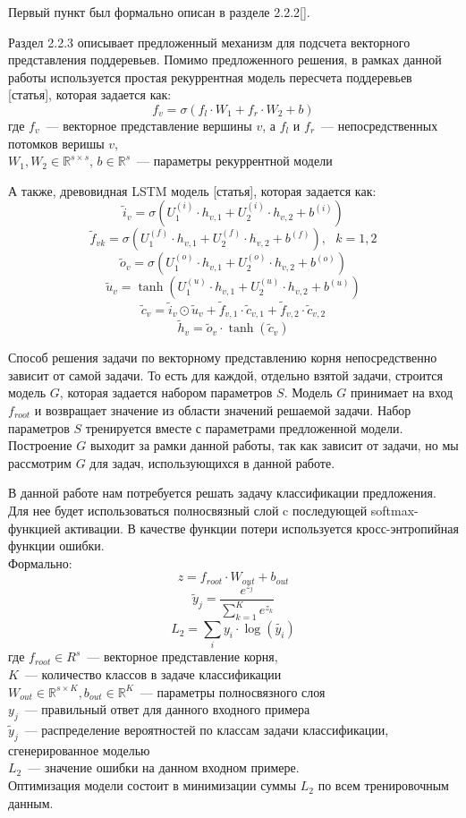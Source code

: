 Первый пункт был формально описан в разделе 2.2.2[].

Раздел 2.2.3 описывает предложенный механизм для подсчета векторного представления поддеревьев.
Помимо предложенного решения, в рамках данной работы используется простая рекуррентная модель пересчета поддеревьев [статья], которая задается как:
$$f_v = \sigma(f_l \cdot W_1 + f_r \cdot W_2 + b)$$
где $f_v$~--- векторное представление вершины $v$, а $f_l$ и $f_r$~--- непосредственных
потомков веришы $v$,\\
$W_1, W_2 \in \mathbb{R}^{s \times s}$,
$b \in \mathbb{R}^s$~--- параметры рекуррентной модели

А также, древовидная LSTM модель [статья], которая задается как:
$$\tilde{i}_v=\sigma \left( U_1^{(i)} \cdot h_{v,1} + U_2^{(i)} \cdot h_{v,2} + b^{(i)} \right)$$
$$\tilde{f}_{vk}=\sigma \left( U_1^{(f)} \cdot h_{v,1} + U_2^{(f)} \cdot h_{v,2} + b^{(f)} \right),\text{ }k=1,2$$
$$\tilde{o}_{v}=\sigma \left( U_1^{(o)} \cdot h_{v,1} + U_2^{(o)} \cdot h_{v,2} + b^{(o)} \right)$$
$$\tilde{u}_{v}=\tanh \left( U_1^{(u)} \cdot h_{v,1} + U_2^{(u)} \cdot h_{v,2} + b^{(u)} \right)$$
$$\tilde{c}_v=\tilde{i}_v \odot \tilde{u}_v + \tilde{f}_{v,1} \cdot \tilde{c}_{v, 1} + \tilde{f}_{v,2} \cdot \tilde{c}_{v, 2}$$
$$\tilde{h}_v=\tilde{o}_v \cdot \tanh(\tilde{c}_v)$$

Способ решения задачи по векторному представлению корня непосредственно зависит от самой задачи.
То есть для каждой, отдельно взятой задачи, строится модель $G$, которая задается набором параметров $S$.
Модель $G$ принимает на вход $f_{root}$ и возвращает значение из области значений решаемой задачи. 
Набор параметров $S$ тренируется вместе с параметрами предложенной модели. Построение $G$ выходит за рамки данной работы, так как зависит от задачи, но мы рассмотрим $G$ для задач, использующихся в данной работе.

В данной работе нам потребуется решать задачу классификации предложения.
Для нее будет использоваться полносвязный слой c последующей softmax-функцией активации. 
В качестве функции потери используется кросс-энтропийная функции ошибки.\\
Формально:
$$z=f_{root} \cdot W_{out} + b_{out}$$
$$\tilde{y}_j=\frac{e^{z_j}} {\sum_{k=1}^K e^{z_k}}$$
$$L_2 = \sum_i y_i \cdot \log(\tilde{y_i})$$
где $f_{root} \in R^s$~--- векторное представление корня,\\
$K$~--- количество классов в задаче классификации\\
$W_{out} \in \mathbb{R}^{s \times K}, b_{out} \in \mathbb{R}^K$~--- параметры полносвязного слоя\\
$y_j$~--- правильный ответ для данного входного примера\\
$\tilde{y}_j$~--- распределение вероятностей по классам задачи классификации, сгенерированное моделью\\
$L_2$~--- значение ошибки на данном входном примере.\\
Оптимизация модели состоит в минимизации суммы $L_2$ по всем тренировочным данным.

